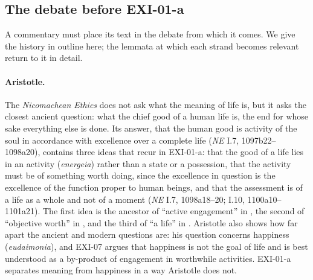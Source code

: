 \subsection{The debate before EXI-01-a}

A commentary must place its text in the debate from which it comes. We give the history in outline here; the lemmata at which each strand becomes relevant return to it in detail.

\paragraph{Aristotle.} The \emph{Nicomachean Ethics} does not ask what the meaning of life is, but it asks the closest ancient question: what the chief good of a human life is, the end for whose sake everything else is done. Its answer, that the human good is activity of the soul in accordance with excellence over a complete life (\emph{NE} I.7, 1097b22--1098a20), contains three ideas that recur in EXI-01-a: that the good of a life lies in an activity (\emph{energeia}) rather than a state or a possession, that the activity must be of something worth doing, since the excellence in question is the excellence of the function proper to human beings, and that the assessment is of a life as a whole and not of a moment (\emph{NE} I.7, 1098a18--20; I.10, 1100a10--1101a21). The first idea is the ancestor of \enquote{active engagement} in , the second of \enquote{objective worth} in , and the third of \enquote{a life} in . Aristotle also shows how far apart the ancient and modern questions are: his question concerns happiness (\emph{eudaimonia}), and EXI-07 argues that happiness is not the goal of life and is best understood as a by-product of engagement in worthwhile activities. EXI-01-a separates meaning from happiness in a way Aristotle does not.

